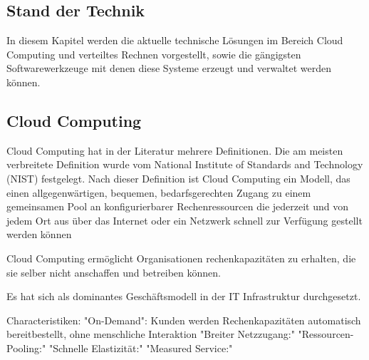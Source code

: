 \subsection*{Stand der Technik}

In diesem Kapitel werden die aktuelle technische Lösungen im Bereich Cloud Computing und verteiltes Rechnen
 vorgestellt, sowie die gängigsten Softwarewerkzeuge mit denen diese Systeme erzeugt und verwaltet werden können.

\subsection*{Cloud Computing}
Cloud Computing hat in der Literatur mehrere Definitionen. \cite{Marston2011} Die am meisten verbreitete Definition
wurde vom National Institute of Standards and Technology (NIST) festgelegt.
Nach dieser Definition ist Cloud Computing ein Modell, das einen allgegenwärtigen,
bequemen, bedarfsgerechten Zugang zu einem gemeinsamen Pool an konfigurierbarer Rechenressourcen
die jederzeit und von jedem Ort aus über das Internet oder ein Netzwerk schnell zur Verfügung gestellt 
werden können \cite{Mell2011} 

Cloud Computing ermöglicht Organisationen rechenkapazitäten zu erhalten, die sie selber nicht anschaffen und 
betreiben können.\cite{Arasaratnam2011}

Es hat sich als dominantes Geschäftsmodell in der IT Infrastruktur durchgesetzt. \cite{Benlian2018}

Characteristiken:
    "On-Demand": Kunden werden Rechenkapazitäten automatisch bereitbestellt, ohne menschliche Interaktion
    "Breiter Netzzugang:" 
    "Ressourcen-Pooling:" 
    "Schnelle Elastizität:" 
    "Measured Service:" 
\clearpage